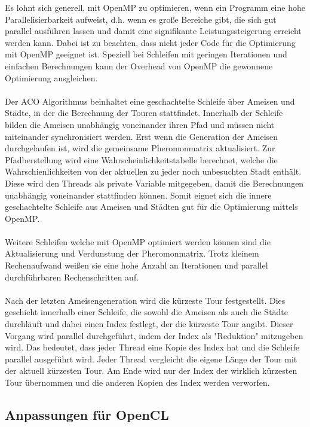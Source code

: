 Es lohnt sich generell, mit OpenMP zu optimieren, wenn ein Programm eine hohe Parallelisierbarkeit aufweist, d.h. wenn es große Bereiche gibt, 
die sich gut parallel ausführen lassen und damit eine signifikante Leistungssteigerung erreicht werden kann.
Dabei ist zu beachten, dass nicht jeder Code für die Optimierung mit OpenMP geeignet ist. Speziell bei Schleifen mit geringen Iterationen und einfachen Berechnungen kann der Overhead von OpenMP die gewonnene Optimierung ausgleichen.
\\\\
Der ACO Algorithmus beinhaltet eine geschachtelte Schleife über Ameisen und Städte, in der die Berechnung der Touren stattfindet.
Innerhalb der Schleife bilden die Ameisen unabhängig voneinander ihren Pfad und müssen nicht miteinander synchronisiert werden.
Erst wenn die Generation der Ameisen durchgelaufen ist, wird die gemeinsame Pheromonmatrix aktualisiert.
Zur Pfadberstellung wird eine Wahrscheinlichkeitstabelle berechnet, welche die Wahrschienlichkeiten von der aktuellen zu jeder noch unbesuchten Stadt enthält.
Diese wird den Threads als private Variable mitgegeben, damit die Berechnungen unabhängig voneinander stattfinden können.
Somit eignet sich die innere geschachtelte Schleife aus Ameisen und Städten gut für die Optimierung mittels OpenMP.
\\\\
Weitere Schleifen welche mit OpenMP optimiert werden können sind die Aktualisierung und Verdunstung der Pheromonmatrix.
Trotz kleinem Rechenaufwand weißen sie eine hohe Anzahl an Iterationen und parallel durchführbaren Rechenschritten auf.
\\\\
Nach der letzten Ameisengeneration wird die kürzeste Tour festgestellt.
Dies geschieht innerhalb einer Schleife, die sowohl die Ameisen als auch die Städte durchläuft und dabei einen Index festlegt, der die kürzeste Tour angibt. 
Dieser Vorgang wird parallel durchgeführt, indem der Index als "Reduktion" mitzugeben wird. 
Das bedeutet, dass jeder Thread eine Kopie des Index hat und die Schleife parallel ausgeführt wird. 
Jeder Thread vergleicht die eigene Länge der Tour mit der aktuell kürzesten Tour. 
Am Ende wird nur der Index der wirklich kürzesten Tour übernommen und die anderen Kopien des Index werden verworfen.

\subsection{Anpassungen für OpenCL}

